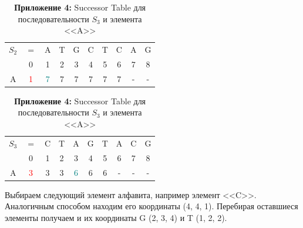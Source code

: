 \documentclass[a4paper,12pt]{extarticle}
\begin{document}
\begin{table}[h!]
  \centering
  \renewcommand{\arraystretch}{1.5}
  \renewcommand{\tabcolsep}{0.25cm}
  \begin{subtable}[h!]{0.45\textwidth}
    \caption*{\textbf{Приложение 3: }Successor Table для последовательности $S_{2}$ и элемента <<A>>}
    \label{table:3}
    \begin{tabular}{ c | c | c | c | c | c | c | c | c | c |}
      $S_{2}$ & $=$ & A & T & G & C & T & C & A & G \\
              & 0 & 1 & 2 & 3 & 4 & 5 & 6 & 7 & 8 \\
      \hline
      A & \textcolor{red}{1} & \textcolor{teal}{7} & 7 & 7 & 7 & 7 & 7 & - & - \\
      \hline
    \end{tabular}
  \end{subtable}\hspace{1.4cm}
  \begin{subtable}[h!]{0.45\textwidth}
    \caption*{\textbf{Приложение 4: }Successor Table для последовательности $S_{3}$ и элемента <<A>>}
    \label{table:4}
    \begin{tabular}{ c | c | c | c | c | c | c | c | c | c |}
      $S_{3}$ & $=$ & C & T & A & G & T & A & C & G \\
              & 0 & 1 & 2 & 3 & 4 & 5 & 6 & 7 & 8 \\
      \hline
      A & \textcolor{red}{3} & 3 & 3 & \textcolor{teal}{6} & 6 & 6 & - & - & - \\
      \hline
    \end{tabular}
  \end{subtable}
\end{table}

Выбираем следующий элемент алфавита, например элемент <<C>>. Аналогичным способом находим его координаты (4, 4, 1). Перебирая оставшиеся элементы получаем и их координаты G (2, 3, 4) и T (1, 2, 2).
\end{document}
